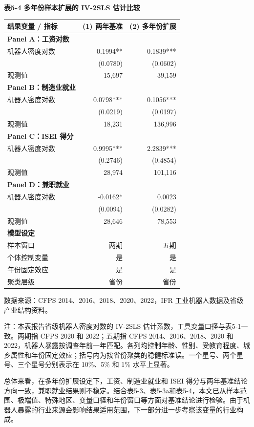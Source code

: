 \documentclass[UTF8, zihao=-4, a4paper, openany, fontset=none]{ctexrep}
\newcounter{none}
\numberwithin{equation}{chapter}
\begin{document}
\textbf{表5-4 多年份样本扩展的 IV-2SLS 估计比较}

{\def\LTcaptype{none} %
\begin{longtable}[]{@{}lrr@{}}
\toprule\noalign{}
结果变量 / 指标 & (1) 两年基准 & (2) 多年份扩展 \\
\midrule\noalign{}
\endhead
\bottomrule\noalign{}
\endlastfoot
\textbf{Panel A：工资对数} & & \\
机器人密度对数 & 0.1994** & 0.1839*** \\
& (0.0780) & (0.0602) \\
观测值 & 15,697 & 39,159 \\
\textbf{Panel B：制造业就业} & & \\
机器人密度对数 & 0.0798*** & 0.1056*** \\
& (0.0219) & (0.0197) \\
观测值 & 18,231 & 136,996 \\
\textbf{Panel C：ISEI 得分} & & \\
机器人密度对数 & 0.9995*** & 2.2839*** \\
& (0.2746) & (0.4854) \\
观测值 & 28,974 & 101,116 \\
\textbf{Panel D：兼职就业} & & \\
机器人密度对数 & -0.0162* & 0.0023 \\
& (0.0094) & (0.0282) \\
观测值 & 28,646 & 78,553 \\
\textbf{模型设定} & & \\
样本窗口 & 两期 & 五期 \\
个体控制变量 & 是 & 是 \\
年份固定效应 & 是 & 是 \\
聚类层级 & 省份 & 省份 \\
\end{longtable}
}

数据来源：CFPS 2014、2016、2018、2020、2022，IFR 工业机器人数据及省级产业结构资料。

注：本表报告省级机器人密度对数的 IV-2SLS 估计系数，工具变量口径与表5-1一致。两期指 CFPS 2020 和 2022；五期指 CFPS 2014、2016、2018、2020 和 2022，机器人暴露按调查年前一年匹配。各列均控制年龄、性别、受教育程度、城乡属性和年份固定效应；括号内为按省份聚类的稳健标准误。一个星号、两个星号、三个星号分别表示在 10\%、5\% 和 1\% 水平上显著。

总体来看，在多年份扩展设定下，工资、制造业就业和 ISEI 得分与两年基准结论方向一致，兼职就业结果则不稳定。结合表5-3、表5-3a和表5-4，本文已从样本范围、极端值、特殊地区、变量口径和年份窗口等方面对基准结论进行检验。由于机器人暴露的行业来源会影响结果适用范围，下一部分进一步考察该变量的行业构成。
\end{document}
